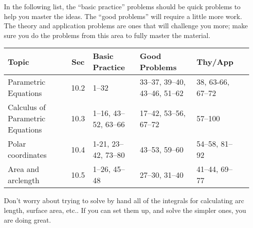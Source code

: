  In the
following list, the ``basic practice'' problems should be quick
problems to help you master the ideas.  The ``good problems'' will
require a little more work.  The theory and application problems are
ones that will challenge you more; make sure you do the problems from
this area to fully master the material.
\medskip
{\noindent \footnotesize 
\begin{tabular}{|l|c|l|l|l|l|}\hline
Topic &Sec &Basic Practice &Good Problems &Thy/App \\\hline
Parametric Equations & 10.2 & 1--32 & 33--37, 39--40, 43--46, 51--62 & 38, 63-66, 67--72 \\\hline
Calculus of Parametric Equations & 10.3 & 1--16, 43--52, 63--66 & 17--42, 53--56, 67--72 & 57--100 \\\hline
Polar coordinates & 10.4 & 1-21, 23--42, 73--80 & 43--53, 59--60 & 54--58, 81--92\\\hline
Area and arclength & 10.5 & 1--26, 45--48 & 27--30, 31--40& 41--44, 69--77\\\hline

\end{tabular}
\smallskip
}

Don't worry about trying to solve by hand all of the integrals for calculating arc length, surface area, etc..  If you can set them up, and solve the simpler ones, you are doing great.


